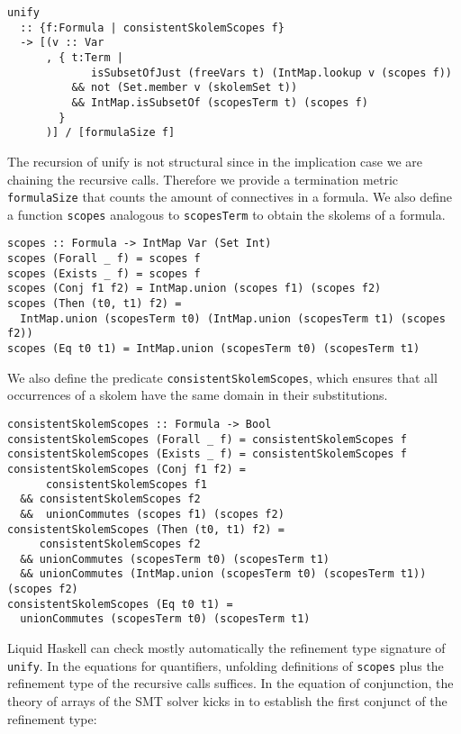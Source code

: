 \documentclass[sigconf, anonymous, review]{acmart}
\newcommand{\tc}[1]{{\small\texttt{#1}}}
\begin{document}
\begin{verbatim}
unify
  :: {f:Formula | consistentSkolemScopes f}
  -> [(v :: Var
      , { t:Term |
             isSubsetOfJust (freeVars t) (IntMap.lookup v (scopes f))
          && not (Set.member v (skolemSet t))
          && IntMap.isSubsetOf (scopesTerm t) (scopes f)
        }
      )] / [formulaSize f]
\end{verbatim}

The recursion of unify is not structural since in the implication case we
are chaining the recursive calls. Therefore we provide a termination
metric \tc{formulaSize} that counts the amount of connectives in a formula.
We also define a function \tc{scopes} analogous to \tc{scopesTerm} to obtain the skolems
of a formula.

\begin{verbatim}
scopes :: Formula -> IntMap Var (Set Int)
scopes (Forall _ f) = scopes f
scopes (Exists _ f) = scopes f
scopes (Conj f1 f2) = IntMap.union (scopes f1) (scopes f2)
scopes (Then (t0, t1) f2) =
  IntMap.union (scopesTerm t0) (IntMap.union (scopesTerm t1) (scopes f2))
scopes (Eq t0 t1) = IntMap.union (scopesTerm t0) (scopesTerm t1)
\end{verbatim}

We also define the predicate \tc{consistentSkolemScopes}, which ensures that
all occurrences of a skolem have the same domain in their substitutions.

\begin{verbatim}
consistentSkolemScopes :: Formula -> Bool
consistentSkolemScopes (Forall _ f) = consistentSkolemScopes f
consistentSkolemScopes (Exists _ f) = consistentSkolemScopes f
consistentSkolemScopes (Conj f1 f2) =
      consistentSkolemScopes f1
  && consistentSkolemScopes f2
  &&  unionCommutes (scopes f1) (scopes f2)
consistentSkolemScopes (Then (t0, t1) f2) =
     consistentSkolemScopes f2
  && unionCommutes (scopesTerm t0) (scopesTerm t1)
  && unionCommutes (IntMap.union (scopesTerm t0) (scopesTerm t1)) (scopes f2)
consistentSkolemScopes (Eq t0 t1) =
  unionCommutes (scopesTerm t0) (scopesTerm t1)
\end{verbatim}

Liquid Haskell can check mostly automatically the refinement type signature of
\tc{unify}. In the equations for quantifiers, unfolding definitions of
\tc{scopes} plus the refinement type of the recursive calls suffices.
In the equation of conjunction, the theory of arrays of the SMT solver
kicks in to establish the first conjunct of the refinement type:
\end{document}
